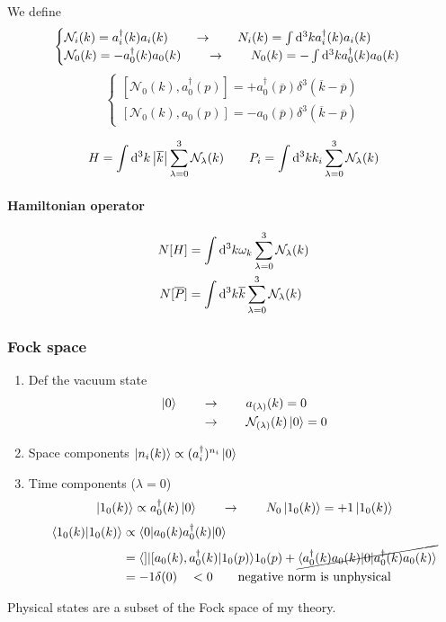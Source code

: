 We define
\[ \begin{cases}
\mathcal{N}_i(k) = a_i^\dagger(k)a_i(k) \qquad \to \qquad N_i(k) = \int \operatorname{d \!}{^3k}a_i^\dagger(k)a_i(k) \\
\mathcal{N}_0(k) = -a_0^\dagger(k)a_0(k) \qquad \to \qquad N_0(k) = -\int \operatorname{d \!}{^3k}a_0^\dagger(k)a_0(k)
\end{cases} \]
\[ \begin{cases}
\left[\mathcal{N}_0(k), a_0^\dagger(p)\right] = + a_0^\dagger(\overline{p})\delta^3(\overline{k}- \overline{p}) \\
\left[\mathcal{N}_0(k), a_0(p)\right] = - a_0(\overline{p})\delta^3(\overline{k}- \overline{p})
\end{cases} \]

\[ H = \int \operatorname{d \!}{^3k}\left|\overline{k}\right|\sum^3_{\lambda=0}\mathcal{N}_\lambda(k) \qquad P_i = \int \operatorname{d \!}{^3k}k_i\sum^3_{\lambda=0}\mathcal{N}_\lambda(k) \]

\paragraph{Hamiltonian operator}
\begin{align*}
N[H] &= \int \operatorname{d \!}{^3k}\omega_k\sum^3_{\lambda=0}\mathcal{N}_\lambda(k) \\
N[\overline{P}] &= \int \operatorname{d \!}{^3k}\overline{k}\sum^3_{\lambda=0}\mathcal{N}_\lambda(k)
\end{align*}

\subsubsection{Fock space}
\begin{enumerate}
\item Def the vacuum state \begin{align*}\left| 0 \right\rangle \qquad &\to \qquad a_{(\lambda)}(k) = 0 \\ &\to \qquad \mathcal{N}_{(\lambda)}(k)\left| 0 \right\rangle = 0\end{align*}
\item Space components $\left| n_i(k) \right\rangle\propto(a^\dagger_i)^{n_i}\left| 0 \right\rangle$
\item Time components ($\lambda = 0$)
\[ \left| 1_0(k) \right\rangle \propto a^\dagger_0(k)\left| 0 \right\rangle \qquad \to \qquad N_0\left| 1_0(k) \right\rangle = +1\left| 1_0(k) \right\rangle \]
\begin{align*}
\braket{1_0(k)}{1_0(k)} &\propto \braket[a_0(k)a_0^\dagger(k)]{0}{0}  \\
&= \braket[[a_0(k),a_0^\dagger(k)]]{1_0(p)}{1_0(p)} + \cancel{\braket[0]{a_0^\dagger(k)a_0(k)}{a_0^\dagger(k)a_0(k)}} \\
&= -1\delta(0) \quad < 0 \qquad \text{negative norm is unphysical}
\end{align*}
\end{enumerate}
Physical states are a subset of the Fock space of my theory.

